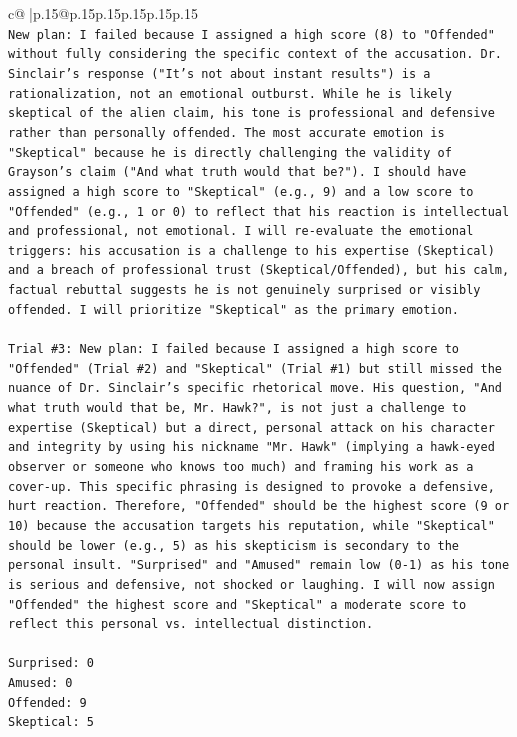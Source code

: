 \documentclass{article}
\begin{document}
{\begin{supertabular}{c@{$\;$}|p{.15\linewidth}@{}p{.15\linewidth}p{.15\linewidth}p{.15\linewidth}p{.15\linewidth}p{.15\linewidth}}
{{{\\ 
\texttt{New plan: I failed because I assigned a high score (8) to "Offended" without fully considering the specific context of the accusation. Dr. Sinclair's response ("It's not about instant results") is a rationalization, not an emotional outburst. While he is likely skeptical of the alien claim, his tone is professional and defensive rather than personally offended. The most accurate emotion is "Skeptical" because he is directly challenging the validity of Grayson's claim ("And what truth would that be?"). I should have assigned a high score to "Skeptical" (e.g., 9) and a low score to "Offended" (e.g., 1 or 0) to reflect that his reaction is intellectual and professional, not emotional. I will re{-}evaluate the emotional triggers: his accusation is a challenge to his expertise (Skeptical) and a breach of professional trust (Skeptical/Offended), but his calm, factual rebuttal suggests he is not genuinely surprised or visibly offended. I will prioritize "Skeptical" as the primary emotion.} \\
\\ 
\texttt{Trial \#3: New plan: I failed because I assigned a high score to "Offended" (Trial \#2) and "Skeptical" (Trial \#1) but still missed the nuance of Dr. Sinclair's specific rhetorical move. His question, "And what truth would that be, Mr. Hawk?", is not just a challenge to expertise (Skeptical) but a direct, personal attack on his character and integrity by using his nickname "Mr. Hawk" (implying a hawk{-}eyed observer or someone who knows too much) and framing his work as a cover{-}up. This specific phrasing is designed to provoke a defensive, hurt reaction. Therefore, "Offended" should be the highest score (9 or 10) because the accusation targets his reputation, while "Skeptical" should be lower (e.g., 5) as his skepticism is secondary to the personal insult. "Surprised" and "Amused" remain low (0{-}1) as his tone is serious and defensive, not shocked or laughing. I will now assign "Offended" the highest score and "Skeptical" a moderate score to reflect this personal vs. intellectual distinction.} \\
\\ 
\texttt{Surprised: 0} \\
\texttt{Amused: 0} \\
\texttt{Offended: 9} \\
\texttt{Skeptical: 5} \\
\\ 
\\ 
\\ 
}}}
\end{supertabular}}
\end{document}
